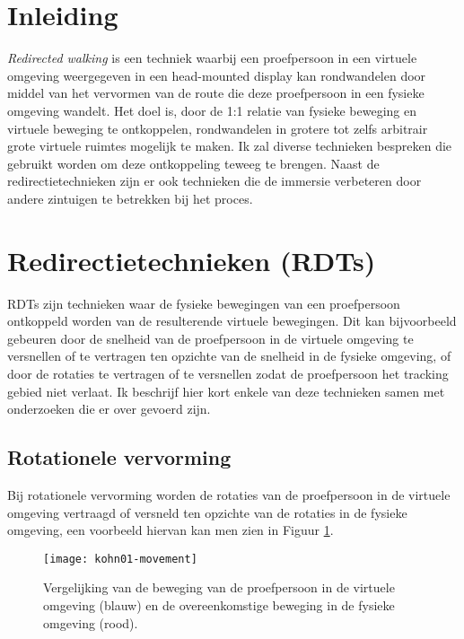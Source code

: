 \section{Inleiding}
\emph{Redirected walking} is een techniek waarbij een proefpersoon in een 
virtuele omgeving weergegeven in een head-mounted display kan rondwandelen door 
middel van het vervormen van de route die deze proefpersoon in een fysieke 
omgeving wandelt. Het doel is, door de 1:1 relatie van fysieke beweging en 
virtuele beweging te ontkoppelen, rondwandelen in grotere tot zelfs arbitrair 
grote virtuele ruimtes mogelijk te maken. Ik zal diverse technieken bespreken die
gebruikt worden om deze ontkoppeling teweeg te brengen. Naast de
redirectietechnieken zijn er ook technieken die de immersie verbeteren door
andere zintuigen te betrekken bij het proces.

\section{Redirectietechnieken (RDTs)}
RDTs zijn technieken waar de fysieke bewegingen van een proefpersoon ontkoppeld
worden van de resulterende virtuele bewegingen. Dit kan bijvoorbeeld gebeuren 
door de snelheid van de proefpersoon in de virtuele omgeving te versnellen of te
vertragen ten opzichte van de snelheid in de fysieke omgeving, of door de
rotaties te vertragen of te versnellen zodat de proefpersoon het tracking gebied
niet verlaat. Ik beschrijf hier kort enkele van deze technieken samen met 
onderzoeken die er over gevoerd zijn.


\subsection{Rotationele vervorming}
Bij rotationele vervorming worden de rotaties van de proefpersoon in de 
virtuele omgeving vertraagd of versneld ten opzichte van de rotaties in de
fysieke omgeving, een voorbeeld hiervan kan men zien in Figuur 
\ref{fig:kohn01-movement}.

\begin{figure}[h!]
    \centering
    \texttt{[image: kohn01-movement]}
    \caption{Vergelijking van de beweging van de proefpersoon in de virtuele
    omgeving (blauw) en de overeenkomstige beweging in de fysieke omgeving 
    (rood).\cite{kohn01}}
    \label{fig:kohn01-movement}
\end{figure}

